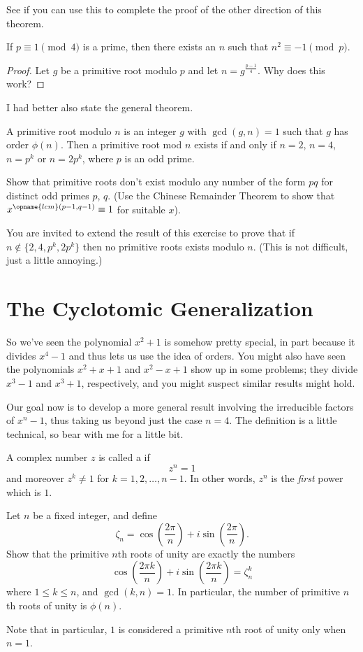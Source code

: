 \documentclass[11pt]{scrartcl}
\begin{document}
See if you can use this to complete the proof of the other direction of this theorem.
\begin{proposition}
  If $p \equiv 1 \pmod 4$ is a prime, then there exists an $n$ such that
  $n^2 \equiv -1 \pmod p$.
\end{proposition}
\begin{proof}
  Let $g$ be a primitive root modulo $p$ and let $n = g^{\frac{p-1}{4}}$.
  Why does this work?
\end{proof}

I had better also state the general theorem.
\begin{theorem}
  A primitive root modulo $n$ is an integer $g$ with $\gcd(g,n) = 1$
  such that $g$ has order $\phi(n)$.
  Then a primitive root mod $n$
  exists if and only if $n=2$, $n=4$, $n=p^k$ or $n=2p^k$,
  where $p$ is an odd prime.
\end{theorem}
\begin{exercise}
  Show that primitive roots don't exist modulo any number of the form $pq$
  for distinct odd primes $p$, $q$.
  (Use the Chinese Remainder Theorem to show that $x^{\opname{lcm}(p-1,q-1)} \equiv 1$
  for suitable $x$).
\end{exercise}
You are invited to extend the result of this exercise to prove that if $n \notin \{2,4,p^k,2p^k\}$
then no primitive roots exists modulo $n$. (This is not difficult, just a little annoying.)

\section{The Cyclotomic Generalization}
So we've seen the polynomial $x^2+1$ is somehow pretty special, in part
because it divides $x^4-1$ and thus lets us use the idea of orders.
You might also have seen the polynomials $x^2+x+1$ and $x^2-x+1$ show up in some problems;
they divide $x^3-1$ and $x^3+1$, respectively, and you might suspect similar results might hold.

Our goal now is to develop a more general result involving the irreducible
factors of $x^n-1$, thus taking us beyond just the case $n=4$.
The definition is a little technical, so bear with me for a little bit.
\begin{definition}
  A complex number $z$ is called a  if
  \[ z^n = 1 \]
  and moreover $z^k \neq 1$ for $k=1,2,\dots,n-1$.
  In other words, $z^n$ is the \emph{first} power which is $1$.
\end{definition}
\begin{exercise}
  Let $n$ be a fixed integer, and define
  \[ \zeta_n = \cos \left( \frac{2\pi}{n} \right) + i \sin\left( \frac{2\pi}{n} \right). \]
  Show that the primitive $n$th roots of unity are exactly the numbers
  \[ \cos \left( \frac{2\pi k}{n} \right) + i \sin \left( \frac{2\pi k}{n} \right) = \zeta_n^k \]
  where $1 \le k \le n$, and $\gcd(k,n) = 1$.
  In particular, the number of primitive $n$th roots of unity is $\phi(n)$.
\end{exercise}
Note that in particular, $1$ is considered a primitive $n$th root of unity only when $n=1$.
\end{document}
